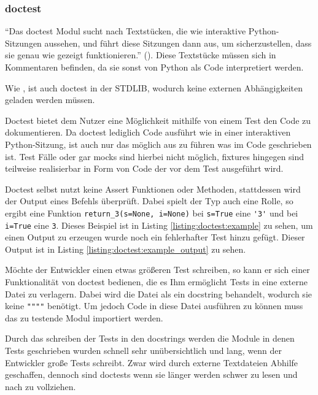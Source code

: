 \subsubsection{doctest}\label{python-tools:doctest}

"`Das doctest Modul sucht nach Textstücken, die wie interaktive Python-Sitzungen aussehen, und führt diese Sitzungen dann aus, um sicherzustellen, dass sie genau wie gezeigt funktionieren."' (\cite{docs.python:doctest}). Diese Textstücke müssen sich in Kommentaren befinden, da sie
sonst von Python als Code interpretiert werden.

Wie , ist auch doctest in der STDLIB, wodurch keine externen
Abhängigkeiten geladen werden müssen.

Doctest bietet dem Nutzer eine Möglichkeit mithilfe von einem Test den Code zu dokumentieren.
Da doctest lediglich Code ausführt wie in einer interaktiven Python-Sitzung, ist auch nur
das möglich aus zu führen was im Code geschrieben ist. Test Fälle oder gar \Glspl{mock} sind 
hierbei nicht möglich, \Glspl{fixture} hingegen sind teilweise realisierbar in Form von Code der
vor dem Test ausgeführt wird.

Doctest selbst nutzt keine Assert Funktionen oder Methoden, stattdessen wird der Output eines
Befehls überprüft. Dabei spielt der Typ auch eine Rolle, so ergibt eine Funktion
\lstinline{return_3(s=None, i=None)} bei \lstinline{s=True} eine \lstinline{'3'} und bei
\lstinline{i=True} eine \lstinline{3}. Dieses Beispiel ist in Listing \ref{listing:doctest:example}
zu sehen, um einen Output zu erzeugen wurde noch ein fehlerhafter Test hinzu gefügt. Dieser Output
ist in Listing \ref{listing:doctest:example_output} zu sehen.

Möchte der Entwickler einen etwas größeren Test schreiben, so kann er sich einer Funktionalität
von doctest bedienen, die es Ihm ermöglicht Tests in eine externe Datei zu verlagern. Dabei
wird die Datei als ein \Gls{docstring} behandelt, wodurch sie keine \lstinline{""""} benötigt.
Um jedoch Code in diese Datei ausführen zu können muss das zu testende Modul importiert werden.

Durch das schreiben der Tests in den \Glspl{docstring} werden die Module in denen Tests geschrieben
wurden schnell sehr unübersichtlich und lang, wenn der Entwickler große Tests schreibt. Zwar wird
durch externe Textdateien Abhilfe geschaffen, dennoch sind doctests wenn sie länger werden
schwer zu lesen und nach zu vollziehen.


